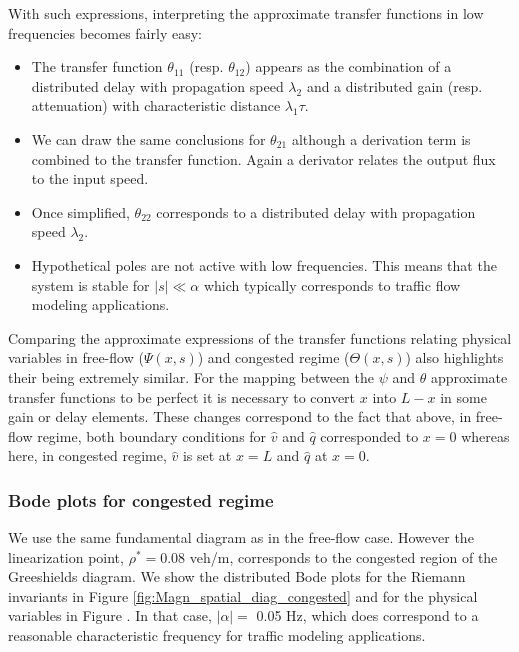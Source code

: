 \documentclass[preprint]{elsarticle}
\begin{document}
With such expressions, interpreting the approximate transfer functions in low frequencies becomes fairly easy:
\begin{itemize}
\item The transfer function $\theta_{11}$ (resp. $\theta_{12}$) appears as the combination of a distributed delay with propagation speed $\lambda_{2}$ and a distributed gain (resp. attenuation) with characteristic distance $\lambda_{1}\tau$.
\item We can draw the same conclusions for $\theta_{21}$ although a derivation term is combined to the transfer function. Again a derivator relates the output flux to the input speed.
\item Once simplified, $\theta_{22}$ corresponds to a distributed delay with propagation speed $\lambda_{2}$.
\item Hypothetical poles are not active with low frequencies. This means that the system is stable for $\left|s\right| \ll \alpha$ which typically corresponds to traffic flow modeling applications.
\end{itemize}

Comparing the approximate expressions of the transfer functions relating physical variables in free-flow ($\Psi\left(x,s\right)$) and congested regime ($\Theta\left(x,s\right)$) also highlights their being extremely similar. For the mapping between the $\psi$ and $\theta$ approximate transfer functions to be perfect it is necessary to convert $x$ into $L-x$ in some gain or delay elements. These changes correspond to the fact that above, in free-flow regime, both boundary conditions for $\hat{v}$ and $\hat{q}$ corresponded to $x=0$ whereas here, in congested regime, $\hat{v}$ is set at $x=L$ and $\hat{q}$ at $x=0$.

\subsubsection{Bode plots for congested regime}
We use the same fundamental diagram as in the free-flow case. However the linearization point, $\rho^* = 0.08$ veh/m, corresponds to the congested region of the Greeshields diagram. We show the distributed Bode plots for the Riemann invariants in Figure \ref{fig:Magn_spatial_diag_congested} and for the physical variables in Figure . In that case, $\left|\alpha\right| =$ 0.05 Hz, which does correspond to a reasonable characteristic frequency for traffic modeling applications.

\end{document}
